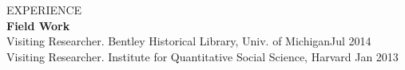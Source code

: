 \documentclass {resume}
\begin{document}
\begin{rSection}{\textrm{EXPERIENCE}}
\medskip\\{\large \textbf{Field Work}}\\
Visiting Researcher. Bentley Historical Library, Univ. of Michigan\hfill Jul 2014\smallskip\\
Visiting Researcher. Institute for Quantitative Social Science, Harvard \hfill Jan 2013%
\end{rSection}%
\end{document}
